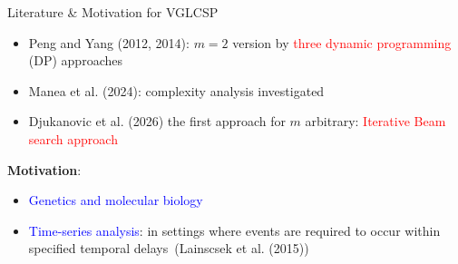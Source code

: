\documentclass{beamer}
\begin{document}
\begin{frame}{Literature \& Motivation for VGLCSP}
   
   \begin{itemize}
       \item  Peng and Yang (2012, 2014):  $m=2$  version by \textcolor{red}{three dynamic programming} (DP) approaches 
       \item  Manea et al. (2024): complexity analysis investigated
        \item Djukanovic et al. (2026) the first approach for $m$ arbitrary: \textcolor{red}{Iterative Beam search approach}
   \end{itemize} \vspace{0.5cm}
   
   \textbf{Motivation}:
   \begin{itemize}
       \item  \textcolor{blue}{Genetics and molecular biology}%
       \item \textcolor{blue}{Time-series analysis}: in settings where events are required to occur within specified temporal delays~(Lainscsek et al. (2015))
   \end{itemize}
   
\end{frame}
\end{document}
